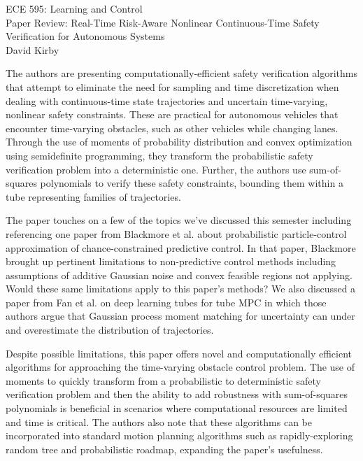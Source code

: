 \documentclass[12pt]{article}
\begin{document}
\begin{center}
\LARGE{ECE 595: Learning and Control\\Paper Review: Real-Time Risk-Aware Nonlinear Continuous-Time Safety Verification for Autonomous Systems}\\[1.5em]
\large David Kirby\\[1.5em]
\end{center}


The authors are presenting computationally-efficient safety verification algorithms that attempt to eliminate the need for sampling and time discretization when dealing with continuous-time state trajectories and uncertain time-varying, nonlinear safety constraints. These are practical for autonomous vehicles that encounter time-varying obstacles, such as other vehicles while changing lanes. Through the use of moments of probability distribution and convex optimization using semidefinite programming, they transform the probabilistic safety verification problem into a deterministic one. Further, the authors use sum-of-squares polynomials to verify these safety constraints, bounding them within a tube representing families of trajectories.

The paper touches on a few of the topics we've discussed this semester including referencing one paper from Blackmore et al. about probabilistic particle-control approximation of chance-constrained predictive control. In that paper, Blackmore brought up pertinent limitations to non-predictive control methods including assumptions of additive Gaussian noise and convex feasible regions not applying. Would these same limitations apply to this paper's methods? We also discussed a paper from Fan et al. on deep learning tubes for tube MPC in which those authors argue that Gaussian process moment matching for uncertainty can under and overestimate the distribution of trajectories.

Despite possible limitations, this paper offers novel and computationally efficient algorithms for approaching the time-varying obstacle control problem. The use of moments to quickly transform from a probabilistic to deterministic safety verification problem and then the ability to add robustness with sum-of-squares polynomials is beneficial in scenarios where computational resources are limited and time is critical. The authors also note that these algorithms can be incorporated into standard motion planning algorithms such as rapidly-exploring random tree and probabilistic roadmap, expanding the paper's usefulness.
\end{document}

